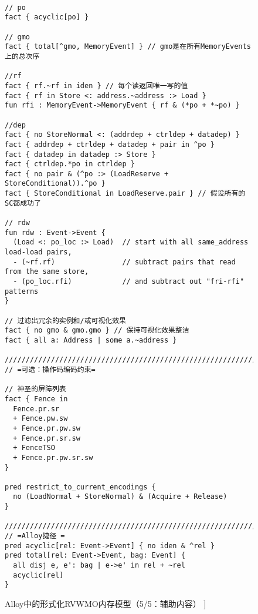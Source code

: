 \begin{figure}[h!]
  {
  \tt\bfseries\centering\footnotesize
  \begin{lstlisting}
// po
fact { acyclic[po] }

// gmo
fact { total[^gmo, MemoryEvent] } // gmo是在所有MemoryEvents上的总次序

//rf
fact { rf.~rf in iden } // 每个读返回唯一写的值
fact { rf in Store <: address.~address :> Load }
fun rfi : MemoryEvent->MemoryEvent { rf & (*po + *~po) }

//dep
fact { no StoreNormal <: (addrdep + ctrldep + datadep) }
fact { addrdep + ctrldep + datadep + pair in ^po }
fact { datadep in datadep :> Store }
fact { ctrldep.*po in ctrldep }
fact { no pair & (^po :> (LoadReserve + StoreConditional)).^po }
fact { StoreConditional in LoadReserve.pair } // 假设所有的SC都成功了

// rdw
fun rdw : Event->Event {
  (Load <: po_loc :> Load)  // start with all same_address load-load pairs,
  - (~rf.rf)                // subtract pairs that read from the same store,
  - (po_loc.rfi)            // and subtract out "fri-rfi" patterns
}

// 过滤出冗余的实例和/或可视化效果
fact { no gmo & gmo.gmo } // 保持可视化效果整洁
fact { all a: Address | some a.~address }

////////////////////////////////////////////////////////////////////////////////
// =可选：操作码编码约束=

// 神圣的屏障列表
fact { Fence in
  Fence.pr.sr
  + Fence.pw.sw
  + Fence.pr.pw.sw
  + Fence.pr.sr.sw
  + FenceTSO
  + Fence.pr.pw.sr.sw
}

pred restrict_to_current_encodings {
  no (LoadNormal + StoreNormal) & (Acquire + Release)
}

////////////////////////////////////////////////////////////////////////////////
// =Alloy捷径 =
pred acyclic[rel: Event->Event] { no iden & ^rel }
pred total[rel: Event->Event, bag: Event] {
  all disj e, e': bag | e->e' in rel + ~rel
  acyclic[rel]
}
\end{lstlisting}}
  \caption{Alloy中的形式化RVWMO内存模型（5/5：辅助内容）
    ]}
  \label{fig:alloy5}
\end{figure}

